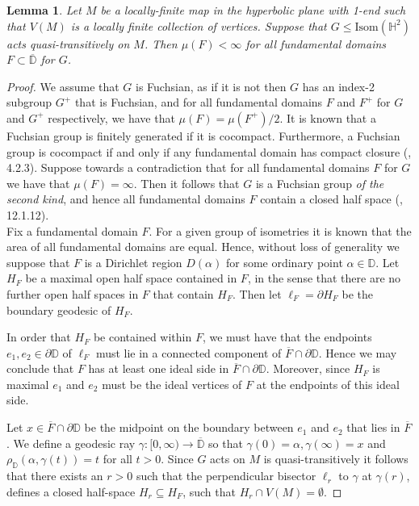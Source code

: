 \documentclass{article}
\numberwithin{equation}{section}
\newcommand{\HH}{\mathbb{H}}
\newtheorem{lemma}{Lemma}[section]
\newtheorem{proposition}[lemma]{Proposition}
\theoremstyle{definition}
\theoremstyle{remark}
\begin{document}
\begin{lemma}\label{lem:hyp_fin_area}
    Let $M$ be a locally-finite map in the hyperbolic plane with 1-end such that $V(M)$ is a locally finite collection of vertices. Suppose that  $G\leq\text{Isom}(\HH^2)$ acts quasi-transitively on $M$. Then $\mu(F)<\infty$ for all fundamental domains $F\subset\overline{\mathbb{D}}$ for $G$.
\end{lemma}
\begin{proof}
    We assume that $G$ is Fuchsian, as if it is not then $G$ has an index-2 subgroup $G^+$ that is Fuchsian, and for all fundamental domains $F$ and $F^+$ for $G$ and $G^+$ respectively, we have that $\mu(F)=\mu(F^+)/2$.
  It is known that a Fuchsian group is finitely generated if it is cocompact. Furthermore, a Fuchsian group is cocompact if and only if any fundamental domain has compact closure (\cite{Fuchsian_Katok}, 4.2.3). 
  Suppose towards a contradiction that for all fundamental domains $F$ for $G$ we have that $\mu(F)=\infty$. Then it follows that $G$ is a Fuchsian group \textit{of the second kind}, and hence all fundamental domains $F$ contain a closed half space (\cite{Ratcliffe_manifolds}, 12.1.12).\\
  Fix a fundamental domain $F$. For a given group of isometries it is known that the area of all fundamental domains are equal. Hence, without loss of generality we suppose that $F$ is a Dirichlet region $D(\alpha)$ for some ordinary point $\alpha\in \mathbb{D}$. Let $H_F$ be a maximal open half space contained in $F$, in the sense that there are no further open half spaces in $F$ that contain $H_F$. Then let $\ell_F=\partial H_F$ be the boundary geodesic of $H_F$.
  
  In order that $H_F$ be contained within $F$, we must have that the endpoints $e_1,e_2\in\partial \mathbb{D}$ of $\ell_F$ must lie in a connected component of $\overline{F}\cap\partial\mathbb{D}$. Hence  we may conclude that $F$ has at least one ideal side in $\overline{F}\cap\partial \mathbb{D}$. Moreover, since $H_F$ is maximal $e_1$ and $e_2$ must be the ideal vertices of $F$ at the endpoints of this ideal side. 
  
  Let $x\in\overline{F}\cap\partial\mathbb{D}$ be the midpoint on the boundary between $e_1$ and $e_2$ that lies in $\overline{F}$. 
  We define a geodesic ray $\gamma:[0,\infty)\rightarrow \overline{\mathbb{D}}$ so that $\gamma(0)=\alpha,\gamma(\infty)=x$ and $\rho_{\mathbb{D}}(\alpha,\gamma(t))=t$ for all $t>0$. Since $G$ acts on $M$ is quasi-transitively it follows that there exists an $r>0$ such that the perpendicular bisector $\ell_r$ to $\gamma$ at $\gamma(r)$, defines a closed half-space $H_r\subseteq H_F$, such that $H_r\cap V(M)=\emptyset $.
  

\end{proof}
\end{document}
